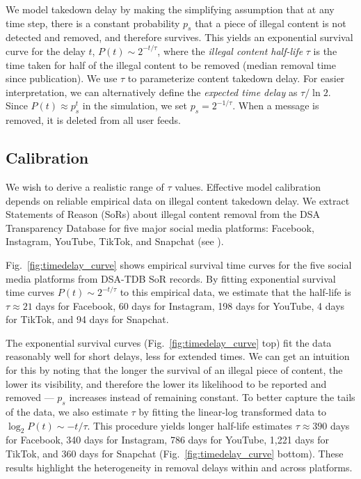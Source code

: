 \documentclass{article}
\begin{document}
We model takedown delay by making the simplifying assumption that at any time step, there is a constant probability $p_s$ that a piece of illegal content is not detected and removed, and therefore survives. 
This yields an exponential survival curve for the delay $t$, $P(t) \sim 2^{-t / \tau}$, where the \emph{illegal content half-life} $\tau$ is the time taken for half of the illegal content to be removed (median removal time since publication). 
We use $\tau$ to parameterize content takedown delay. 
For easier interpretation, we can alternatively define the \emph{expected time delay} as $\tau / \ln 2$. 
Since $P(t) \approx p_s^t$ in the simulation, we set $p_s = 2^{-1/\tau}$. When a message is removed, it is deleted from all user feeds.

\subsection*{Calibration}
\label{sec:calibration}

We wish to derive a realistic range of $\tau$ values. 
Effective model calibration depends on reliable empirical data on illegal content takedown delay. 
We extract Statements of Reason (SoRs) about illegal content removal from the DSA Transparency Database for five major social media platforms: Facebook, Instagram, YouTube, TikTok, and Snapchat (see ). 

Fig.~\ref{fig:timedelay_curve} shows empirical survival time curves for the five social media platforms from DSA-TDB SoR records.  
By fitting exponential survival time curves $P(t) \sim 2^{-t/\tau}$ to this empirical data, we estimate that the half-life is $\tau \approx 21$ days for Facebook, 60 days for Instagram, 198 days for YouTube, 4 days for TikTok, and 94 days for Snapchat.

The exponential survival curves (Fig.~\ref{fig:timedelay_curve} top) fit the data reasonably well for short delays, less for extended times. 
We can get an intuition for this by noting that the longer the survival of an illegal piece of content, the lower its visibility, and therefore the lower its likelihood to be reported and removed --- $p_s$ increases instead of remaining constant. 
To better capture the tails of the data, we also estimate $\tau$ by fitting the linear-log transformed data to $\log_2 P(t) \sim -t / \tau$. This procedure yields longer half-life estimates $\tau \approx 390$ days for Facebook, 340 days for Instagram, 786 days for YouTube, 1,221 days for TikTok, and 360 days for Snapchat (Fig.~\ref{fig:timedelay_curve} bottom).
These results highlight the heterogeneity in removal delays within and across platforms. 
\end{document}
